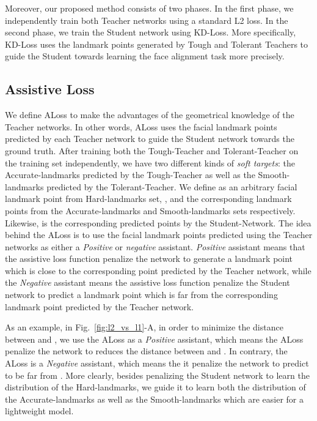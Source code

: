 \documentclass[times,twocolumn,final,authoryear]{elsarticle}
\begin{document}
Moreover, our proposed method consists of two phases. In the first phase, we independently train both Teacher networks using a standard L2 loss. In the second phase, we train the Student network using KD-Loss. More specifically, KD-Loss uses the landmark points generated by Tough and Tolerant Teachers to guide the Student towards learning the face alignment task more precisely. 

\subsection{Assistive Loss} \label{sec:assistedLoss}
We define ALoss to make the advantages of the geometrical knowledge of the Teacher networks. In other words, ALoss uses the facial landmark points predicted by each Teacher network to guide the Student network towards the ground truth. After training both the Tough-Teacher and Tolerant-Teacher on the training set independently, we have two different kinds of \textit{soft targets}: the Accurate-landmarks predicted by the Tough-Teacher as well as the Smooth-landmarks predicted by the Tolerant-Teacher. We define  as an arbitrary facial landmark point from Hard-landmarks set, , and  the corresponding landmark points from the Accurate-landmarks and Smooth-landmarks sets respectively. Likewise,  is the corresponding predicted points by the Student-Network. The idea behind the ALoss is to use the facial landmark points predicted using the Teacher networks as either a \textit{Positive} or \textit{negative} assistant. \textit{Positive} assistant means that the assistive loss function penalize the network to generate a landmark point which is close to the corresponding point predicted by the Teacher network, while the \textit{Negative} assistant means the assistive loss function penalize the Student network to predict a landmark point which is far from the corresponding landmark point predicted by the Teacher network.

As an example, in Fig.~\ref{fig:l2_vs_l1}-A, in order to minimize the distance between  and , we use the ALoss as a \textit{Positive} assistant, which means the ALoss penalize the network to reduces the distance between  and . In contrary, the ALoss is a \textit{Negative} assistant, which means the it penalize the network to predict  to be far from . More clearly, besides penalizing the Student network to learn the distribution of the Hard-landmarks, we guide it to learn both the distribution of the Accurate-landmarks as well as the Smooth-landmarks which are easier for a lightweight model. 
\end{document}
